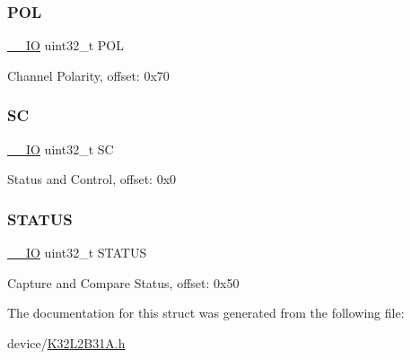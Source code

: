 \subsubsection{\texorpdfstring{POL}{POL}}
{\footnotesize\ttfamily \mbox{\hyperlink{core__cm0plus_8h_aec43007d9998a0a0e01faede4133d6be}{\+\_\+\+\_\+\+IO}} uint32\+\_\+t P\+OL}

Channel Polarity, offset\+: 0x70 \mbox{\label{struct_t_p_m___type_a71c139861c5c28b6a6e81b2b1c72946a}} 
\subsubsection{\texorpdfstring{SC}{SC}}
{\footnotesize\ttfamily \mbox{\hyperlink{core__cm0plus_8h_aec43007d9998a0a0e01faede4133d6be}{\+\_\+\+\_\+\+IO}} uint32\+\_\+t SC}

Status and Control, offset\+: 0x0 \mbox{\label{struct_t_p_m___type_a0b3f4c41f87ca52c3b6bca0bafa0df6b}} 
\subsubsection{\texorpdfstring{STATUS}{STATUS}}
{\footnotesize\ttfamily \mbox{\hyperlink{core__cm0plus_8h_aec43007d9998a0a0e01faede4133d6be}{\+\_\+\+\_\+\+IO}} uint32\+\_\+t S\+T\+A\+T\+US}

Capture and Compare Status, offset\+: 0x50 

The documentation for this struct was generated from the following file\+:\begin{DoxyCompactItemize}
\item 
device/\mbox{\hyperlink{_k32_l2_b31_a_8h}{K32\+L2\+B31\+A.\+h}}\end{DoxyCompactItemize}
